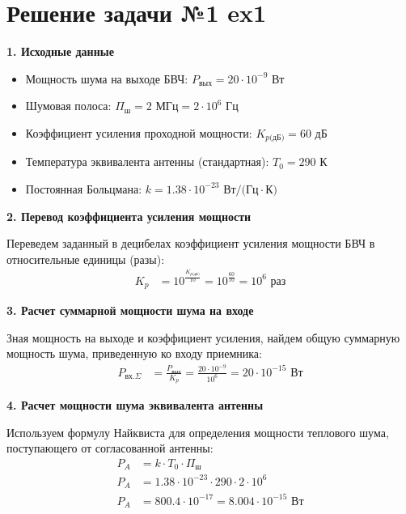 \section{Решение задачи №1 ex1}
\vspace{1em}
\textbf{1. Исходные данные}
\begin{itemize}
    \item Мощность шума на выходе БВЧ: $P_{\text{вых}} = 20 \cdot 10^{-9} \text{ Вт}$
    \item Шумовая полоса: $\Pi_{\text{ш}} = 2 \text{ МГц} = 2 \cdot 10^6 \text{ Гц}$
    \item Коэффициент усиления проходной мощности: $K_{p\text{(дБ)}} = 60 \text{ дБ}$
    \item Температура эквивалента антенны (стандартная): $T_0 = 290 \text{ К}$
    \item Постоянная Больцмана: $k = 1.38 \cdot 10^{-23} \text{ Вт/(Гц}\cdot\text{К)}$
\end{itemize}

\vspace{1em}
\textbf{2. Перевод коэффициента усиления мощности}

Переведем заданный в децибелах коэффициент усиления мощности БВЧ в относительные единицы (разы):
\begin{align*}
K_p &= 10^{\frac{K_{p\text{(дБ)}}}{10}} = 10^{\frac{60}{10}} = 10^6 \text{ раз}
\end{align*}

\vspace{1em}
\textbf{3. Расчет суммарной мощности шума на входе}

Зная мощность на выходе и коэффициент усиления, найдем общую суммарную мощность шума, приведенную ко входу приемника:
\begin{align*}
P_{\text{вх.}\Sigma} &= \frac{P_{\text{вых}}}{K_p} = \frac{20 \cdot 10^{-9}}{10^6} = 20 \cdot 10^{-15} \text{ Вт}
\end{align*}

\vspace{1em}
\textbf{4. Расчет мощности шума эквивалента антенны}

Используем формулу Найквиста для определения мощности теплового шума, поступающего от согласованной антенны:
\begin{align*}
P_A &= k \cdot T_0 \cdot \Pi_{\text{ш}} \\
P_A &= 1.38 \cdot 10^{-23} \cdot 290 \cdot 2 \cdot 10^6 \\
P_A &= 800.4 \cdot 10^{-17} = 8.004 \cdot 10^{-15} \text{ Вт}
\end{align*}

